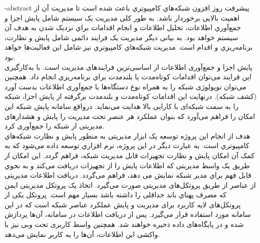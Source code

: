 
\fa-abstract{
    پیشرفت روز افزون شبکه‌هاي کامپیوتري باعث شده است تا مدیریت آن از اهمیت بالایی برخوردار باشد. به طور کلی مدیریت یک سیستم شامل پایش اجزا و جمع‌آوري اطلاعات، تحلیل اطلاعات و انجام اقدامات براي نزدیک شدن به هدف آن سیستم خواهد بود. به بیانی دیگر مدیریت یک فرایند دائمی شامل پایش و نظارت، برنامه‌ریزي و اقدام است. مدیریت شبکه‌هاي کامپیوتري نیز شامل این فعالیت‌ها خواهد بود.
    \\
    پایش اجزا و جمع‌آوری اطلاعات از اساسی‌ترین فرایندهای مدیریت است. با به‌کارگیری این فرایند می‌توان اقدامات کوتاه‌مدت یا بلندمدت براي برنامه‌ریزي انجام داد. همچنین می‌توان توپولوژی شبکه را به همراه نوع دستگاه‌ها با جمع‌آوری اطلاعات بدست آورد (کشف شبکه). درنهایت این اقدامات کوتاه‌مدت و بلندمدت برگرفته از پایش اجزا، شبکه را به سمت شبکه‌ای با کارایی بالا هدایت می‌نماید. درواقع سامانه پایش شبکه این امکان را فراهم می‌آورد که بتوان عملکرد هر عنصر تحت مدیریت را پایش و هشدارهای مدیریتی از شبکه را جمع‌آوری کرد.
    \\
    هدف از انجام این پروژه توسعه یک ابزار مدیریتی به منظور پایش و نظارت شبکه‌هاي کامپیوتري است. به عبارت دیگر در این پروژه، نرم افزاري توسعه داده می‌شود که به کمک آن امکان پایش و نظارت تجهیزات قابل مدیریت شبکه، فراهم گردد. این امکان از طریق یک واسط مدیریتی که اطلاعات پایش را از تجهیزات دریافت می‌کند و به نحوي قابل فهم براي مدیر شبکه نمایش می دهد، فراهم می‌گردد. دریافت اطلاعات مدیریتی از عناصر از طریق پروتکل‌های مدیریتی صورت می‌گیرد. اتخاذ یک پروتکل مدیریتی ایمن که مصرف پهناي باند حداقلی را داشته باشد بسیار مهم است. پروتکل  یکی از پروتکل‌های لایه کاربرد برای مدیریت و پایش عملکرد عناصر شبکه است که در این سامانه مورد استفاده قرار می‌گیرد. پس از دریافت اطلاعات در سامانه، آن‌ها پردازش شده و در پایگاه‌های داده ذخیره خواهند شد. همچنین واسط کاربری تحت وبی نیز با واکشی این اطلاعات، آن‌ها را به کاربر نمایش می‌دهد.}


